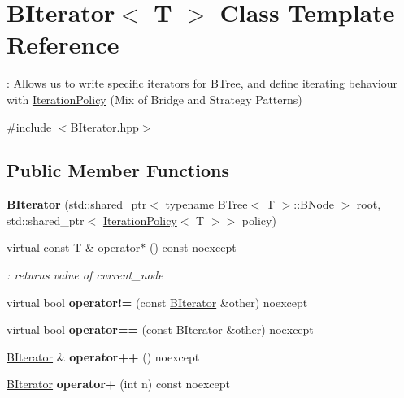 \hypertarget{classBIterator}{}\section{B\+Iterator$<$ T $>$ Class Template Reference}
\label{classBIterator}


\+: Allows us to write specific iterators for \hyperlink{classBTree}{B\+Tree}, and define iterating behaviour with \hyperlink{classIterationPolicy}{Iteration\+Policy} (Mix of Bridge and Strategy Patterns)  




{\ttfamily \#include $<$B\+Iterator.\+hpp$>$}

\subsection*{Public Member Functions}
\begin{DoxyCompactItemize}
\item 
\mbox{\label{classBIterator_a70e5ef674a148d7efcc6e2399c7ad337}} 
{\bfseries B\+Iterator} (std\+::shared\+\_\+ptr$<$ typename \hyperlink{classBTree}{B\+Tree}$<$ T $>$\+::B\+Node $>$ root, std\+::shared\+\_\+ptr$<$ \hyperlink{classIterationPolicy}{Iteration\+Policy}$<$ T $>$$>$ policy)
\item 
\mbox{\label{classBIterator_a2881a68f1b77b33fca0b10bc8f9b16bc}} 
virtual const T \& \hyperlink{classBIterator_a2881a68f1b77b33fca0b10bc8f9b16bc}{operator$\ast$} () const noexcept
\begin{DoxyCompactList}\small\item\em \+: returns value of current\+\_\+node \end{DoxyCompactList}\item 
\mbox{\label{classBIterator_a5b7417b24265f286d0e0086b7612f068}} 
virtual bool {\bfseries operator!=} (const \hyperlink{classBIterator}{B\+Iterator} \&other) noexcept
\item 
\mbox{\label{classBIterator_aafec736be0811d439943b0194dfb7db5}} 
virtual bool {\bfseries operator==} (const \hyperlink{classBIterator}{B\+Iterator} \&other) noexcept
\item 
\mbox{\label{classBIterator_a52a58da21d5eb11c0c84ffb8570b45d2}} 
\hyperlink{classBIterator}{B\+Iterator} \& {\bfseries operator++} () noexcept
\item 
\mbox{\label{classBIterator_a066f91cbacb2ef4de98f33dcb22c25c4}} 
\hyperlink{classBIterator}{B\+Iterator} {\bfseries operator+} (int n) const noexcept
\end{DoxyCompactItemize}
